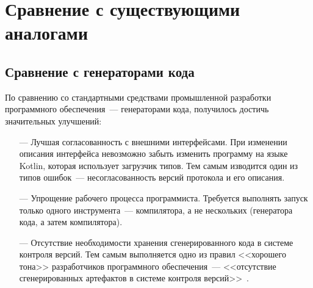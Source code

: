 \section{Сравнение с существующими аналогами}


\subsection{Сравнение с генераторами кода}
По сравнению со стандартными средствами промышленной разработки программного обеспечения~--- генераторами кода,
получилось достичь значительных улучшений:
\begin{itemize}
	\item[---] Лучшая согласованность с внешними интерфейсами. При изменении описания интерфейса невозможно забыть изменить программу на языке Kotlin, которая использует загрузчик типов. Тем самым изводится один из типов ошибок~--- несогласованность версий протокола и его описания.
	\item[---] Упрощение рабочего процесса программиста. Требуется выполнять запуск только одного инструмента~--- компилятора, а не нескольких (генератора кода, а затем компилятора).
	\item[---] Отсутствие необходимости хранения сгенерированного кода в системе контроля версий. Тем самым выполняется одно из правил <<хорошего тона>> разработчиков программного обеспечения~--- <<отсутствие сгенерированных артефактов в системе контроля версий>>~\cite{art-of-agile}.
\end{itemize}

